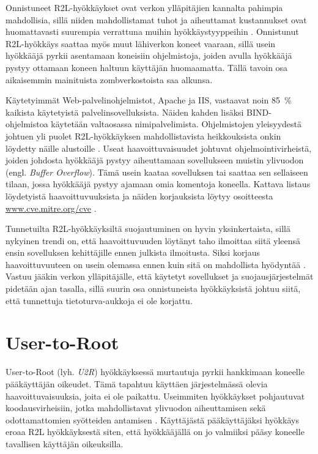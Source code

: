 Onnistuneet R2L-hyökkäykset ovat verkon ylläpitäjien kannalta pahimpia
mahdollisia, sillä niiden mahdollistamat tuhot ja aiheuttamat kustannukset ovat
huomattavasti suurempia verrattuna muihin hyökkäystyyppeihin \cite{IDSb}. Onnistunut R2L-hyökkäys saattaa
myös muut lähiverkon koneet vaaraan, sillä usein hyökkääjä pyrkii asentamaan
koneisiin ohjelmistoja, joiden avulla hyökkääjä pystyy ottamaan koneen haltuun
käyttäjän huomaamatta. Tällä tavoin osa aikaisemmin mainituista
zombverkostoista saa alkunsa.

Käytetyimmät Web-palvelinohjelmistot, Apache ja IIS, vastaavat noin 85~\%
kaikista käytetyistä palvelinsovelluksista. Näiden kahden lisäksi
BIND-\-ohjelmistoa käytetään valtaosassa nimipalvelimista. Ohjelmistojen yleisyydestä
johtuen yli puolet R2L-hyökkäyksen mahdollistavista heikkouksista onkin
löydetty näille alustoille \cite{IDS}. Useat haavoittuvaisuudet johtuvat
ohjelmointivirheistä, joiden johdosta hyökkääjä pystyy aiheuttamaan
sovellukseen muistin ylivuodon (engl. \textit{Buffer Overflow}). Tämä usein kaataa
sovelluksen tai saattaa sen sellaiseen tilaan, jossa hyökkääjä pystyy ajamaan
omia komentoja koneella. Kattava listaus löydetyistä haavoittuvuuksista ja näiden
korjauksista löytyy osoitteesta \url{www.cve.mitre.org/cve} \cite{CVE}.

Tunnetuilta R2L-hyökkäyksiltä suojautuminen on hyvin yksinkertaista, sillä
nykyinen trendi on, että haavoittuvuuden löytänyt taho ilmoittaa siitä
yleensä ensin
sovelluksen kehittäjille ennen julkista ilmoitusta. Siksi korjaus
haavoittuvuuteen on usein olemassa ennen kuin sitä on mahdollista hyödyntää \cite{IDSb}.
Vastuu jääkin verkon ylläpitäjälle, että käytetyt sovellukset ja 
suojausjärjestelmät pidetään ajan tasalla, sillä suurin osa onnistuneista hyökkäyksistä 
johtuu siitä, että tunnettuja tietoturva-aukkoja ei ole korjattu.

\section{User-to-Root}

User-to-Root (lyh. \textit{U2R}) hyökkäyksessä murtautuja pyrkii hankkimaan
koneelle pääkäyttäjän oikeudet. Tämä tapahtuu käyttäen järjestelmässä
olevia haavoittuvaisuuksia, joita ei ole paikattu. Useimmiten
hyökkäykset pohjautuvat koodausvirheisiin, jotka mahdollistavat
ylivuodon aiheuttamisen sekä odottamattomien syötteiden antamisen
\cite{IDS}. Käyttäjästä pääkäyttäjäksi hyökkäys eroaa R2L hyökkäyksestä
siten, että hyökkääjällä on jo valmiiksi pääsy koneelle tavallisen
käyttäjän oikeuksilla.

